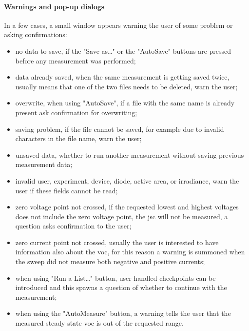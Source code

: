 \paragraph{Warnings and pop-up dialogs}
In a few cases, a small window appears warning the user of some problem or asking confirmations:
\begin{itemize}
	\item no data to save, if the "Save as\dots" or the "AutoSave" buttons are pressed before any measurement was performed;
	\item data already saved, when the same measurement is getting saved twice, usually means that one of the two files needs to be deleted, warn the user;
	\item overwrite, when using "AutoSave", if a file with the same name is already present ask confirmation for overwriting;
	\item saving problem, if the file cannot be saved, for example due to invalid characters in the file name, warn the user;
	\item unsaved data, whether to run another measurement without saving previous measurement data;
	\item invalid user, experiment, device, diode, active area, or irradiance, warn the user if these fields cannot be read;
	\item zero voltage point not crossed, if the requested lowest and highest voltages does not include the zero voltage point, the \gls{jsc} will not be measured, a question asks confirmation to the user;
	\item zero current point not crossed, usually the user is interested to have information also about the \gls{voc}, for this reason a warning is summoned when the sweep did not measure both negative and positive currents;
	\item when using "Run a List\dots" button, user handled checkpoints can be introduced and this spawns a question of whether to continue with the measurement;
	\item when using the "AutoMeasure" button, a warning tells the user that the measured steady state \gls{voc} is out of the requested range.
\end{itemize}
 
